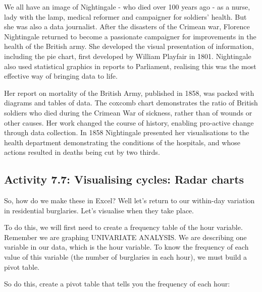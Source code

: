 \documentclass[
]{book}
\begin{document}
We all have an image of Nightingale - who died over 100 years ago - as a nurse, lady with the lamp, medical reformer and campaigner for soldiers' health. But she was also a data journalist. After the disasters of the Crimean war, Florence Nightingale returned to become a passionate campaigner for improvements in the health of the British army. She developed the visual presentation of information, including the pie chart, first developed by William Playfair in 1801. Nightingale also used statistical graphics in reports to Parliament, realising this was the most effective way of bringing data to life.

Her report on mortality of the British Army, published in 1858, was packed with diagrams and tables of data. The coxcomb chart demonstrates the ratio of British soldiers who died during the Crimean War of sickness, rather than of wounds or other causes. Her work changed the course of history, enabling pro-active change through data collection. In 1858 Nightingale presented her visualisations to the health department demonstrating the conditions of the hospitals, and whose actions resulted in deaths being cut by two thirds.

\hypertarget{activity-7.7-visualising-cycles-radar-charts}{%
\subsection{Activity 7.7: Visualising cycles: Radar charts}\label{activity-7.7-visualising-cycles-radar-charts}}

So, how do we make these in Excel? Well let's return to our within-day variation in residential burglaries. Let's visualise when they take place.

To do this, we will first need to create a frequency table of the hour variable. Remember we are graphing UNIVARIATE ANALYSIS. We are describing one variable in our data, which is the hour variable. To know the frequency of each value of this variable (the number of burglaries in each hour), we must build a pivot table.

So do this, create a pivot table that tells you the frequency of each hour:
\end{document}
